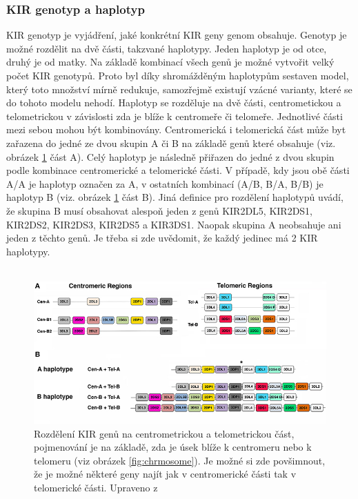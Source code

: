 \documentclass[czech,DP]{thesiskiv}
\numberwithin{equation}{section}
\begin{document}
\subsubsection{KIR genotyp a haplotyp}
KIR genotyp je vyjádření, jaké konkrétní KIR geny genom obsahuje. Genotyp je možné rozdělit na dvě části, takzvané haplotypy. Jeden haplotyp je od otce, druhý je od matky. Na základě kombinací všech genů je možné vytvořit velký počet KIR genotypů. Proto byl díky shromážděným haplotypům sestaven model, který toto množství mírně redukuje, samozřejmě existují  vzácné varianty, které se do tohoto modelu nehodí. Haplotyp se rozděluje na dvě části, centrometickou a telometrickou v závislosti zda je blíže k centromeře či telomeře. Jednotlivé části mezi sebou mohou být kombinovány. Centromerická i telomerická část může byt zařazena do jedné ze dvou skupin A či B na základě genů které obsahuje (viz. obrázek \ref{fig:kir_haplotypy_ct} část A). Celý haplotyp je následně přiřazen do jedné z dvou skupin podle kombinace centromerické a telomerické části. V případě, kdy jsou obě části A/A je haplotyp označen za A, v ostatních kombinací (A/B, B/A, B/B) je haplotyp B (viz. obrázek \ref{fig:kir_haplotypy_ct} část B). Jiná definice pro rozdělení haplotypů uvádí, že skupina B musí obsahovat alespoň jeden z genů KIR2DL5, KIR2DS1, KIR2DS2, KIR2DS3, KIR2DS5 a KIR3DS1. Naopak skupina A neobsahuje ani jeden z těchto genů. Je třeba si zde uvědomit, že každý jedinec má 2 KIR haplotypy. \cite{KIR_haplotypy_ct}
\\
\\
\begin{figure}[H]		
		\centering
		\includegraphics[width=\textwidth]{./img/KIR_haplotype.jpg}
		\caption{Rozdělení KIR genů na centrometrickou a telometrickou část, pojmenování je na základě, zda je úsek blíže k centromeru nebo k telomeru (viz obrázek \ref{fig:chrmosome}). Je možné si zde povšimnout, že je možné některé geny najít jak v centromerické části tak v telomerické části. Upraveno z \cite{KIR_haplotypy_ct}}
		\label{fig:kir_haplotypy_ct}
\end{figure}
\end{document}
